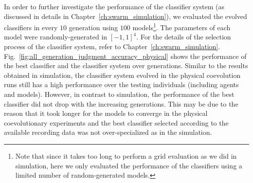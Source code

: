 In order to further investigate the performance of the classifier system (as discussed in details in Chapter~\ref{ch:swarm_simulation}), we evaluated the evolved classifiers in every $10$ generation using $100$ models\footnote{Note that since it takes too long to perform a grid evaluation as we did in simulation, here we only evaluated the performance of the classifiers using a limited number of random-generated models.}. The parameters of each model were randomly-generated in $[-1,1]^4$. For the details of the selection process of the classifier system, refer to Chapter~\ref{ch:swarm_simulation}. Fig.~\ref{fig:all_generation_judgment_accuracy_physical} shows the performance of the best classifier and the classifier system over generations. Similar to the results obtained in simulation, the classifier system evolved in the physical coevolution runs still has a high performance over the testing individuals (including agents and models). However, in contrast to simulation, the performance of the best classifier did not drop with the increasing generations. This may be due to the reason that it took longer for the models to converge in the physical coevolutionary experiments and the best classifier selected according to the available recording data was not over-specialized as in the simulation. 

